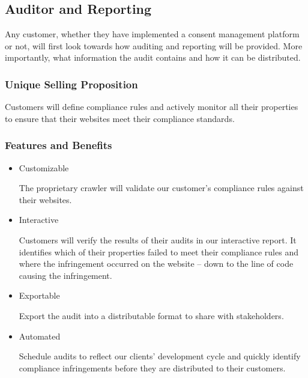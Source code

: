 \subsection{Auditor and Reporting}

Any customer, whether they have implemented a consent management platform or not, will first look towards how auditing and reporting will be provided. More importantly, what information the audit contains and how it can be distributed.

\subsubsection*{Unique Selling Proposition}

Customers will define compliance rules and actively monitor all their properties to ensure that their websites meet their compliance standards.

\subsubsection*{Features and Benefits}

\begin{itemize}

\item Customizable

  The proprietary crawler will validate our customer's compliance rules against their websites.

\item Interactive

  Customers will verify the results of their audits in our interactive report. It identifies which of their properties failed to meet their compliance rules and where the infringement occurred on the website -- down to the line of code causing the infringement.

\item Exportable

  Export the audit into a distributable format to share with stakeholders.

\item Automated

  Schedule audits to reflect our clients' development cycle and quickly identify compliance infringements before they are distributed to their customers.

\end{itemize}


